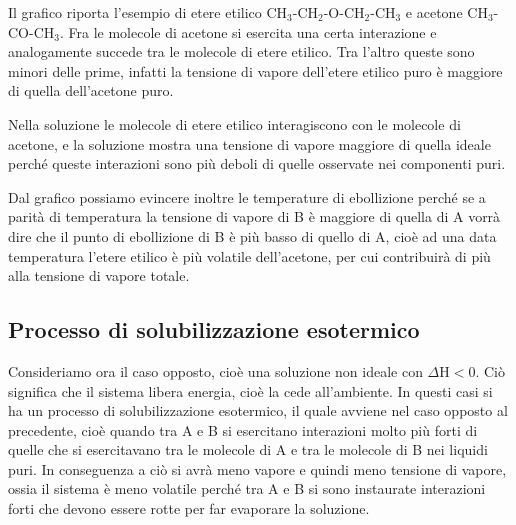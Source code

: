 \vspace{0.3cm}Il grafico riporta l'esempio di etere etilico CH$_3$-CH$_2$-O-CH$_2$-CH$_3$ e acetone CH$_3$-CO-CH$_3$. Fra le molecole di acetone si esercita una certa interazione e analogamente succede tra le molecole di etere etilico. Tra l'altro queste sono minori delle prime, infatti la tensione di vapore dell'etere etilico puro è maggiore di quella dell'acetone puro.

Nella soluzione le molecole di etere etilico interagiscono con le molecole di acetone, e la soluzione mostra una tensione di vapore maggiore di quella ideale perché queste interazioni sono più deboli di quelle osservate nei componenti puri.

Dal grafico possiamo evincere inoltre le temperature di ebollizione perché se a parità di temperatura la tensione di vapore di B è maggiore di quella di A vorrà dire che il punto di ebollizione di B è più basso di quello di A, cioè ad una data temperatura l'etere etilico è più volatile dell'acetone, per cui contribuirà di più alla tensione di vapore totale.

\subsection{Processo di solubilizzazione esotermico}

Consideriamo ora il caso opposto, cioè una soluzione non ideale con $\Delta$H$<$0. Ciò significa che il sistema libera energia, cioè la cede all'ambiente. In questi casi si ha un processo di solubilizzazione esotermico, il quale avviene nel caso opposto al precedente, cioè quando tra A e B si esercitano interazioni molto più forti di quelle che si esercitavano tra le molecole di A e tra le molecole di B nei liquidi puri. In conseguenza a ciò si avrà meno vapore e quindi meno tensione di vapore, ossia il sistema è meno volatile perché tra A e B si sono instaurate interazioni forti che devono essere rotte per far evaporare la soluzione.

